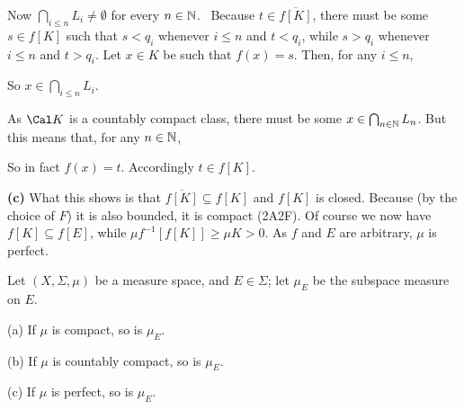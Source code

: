 {\noindent Now $\bigcap_{i\le n}L_i\ne\emptyset$ for every $n\in\Bbb N$.
\Prf\ Because $t\in\overline{f[K]}$, there must be some $s\in f[K]$ such
that $s<q_i$ whenever $i\le n$ and $t<q_i$, while $s>q_i$ whenever $i\le
n$ and $t>q_i$.   Let $x\in K$ be such that $f(x)=s$.   Then, for any
$i\le n$,




\noindent So $x\in\bigcap_{i\le n}L_i$.\ \Qed

As $\Cal K$ is a countably compact class, there must be some
$x\in\bigcap_{n\in\Bbb N}L_n$.   But this means that, for any $n\in\Bbb
N$,



\noindent So in fact $f(x)=t$.   Accordingly $t\in f[K]$.

\medskip

{\bf (c)} What this shows is that $\overline{f[K]}\subseteq f[K]$ and
$f[K]$ is closed.   Because (by the choice of $F$) it is also bounded,
it is compact (2A2F).   Of course we now have $f[K]\subseteq f[E]$,
while $\mu f^{-1}[f[K]]\ge\mu K>0$.   As $f$ and $E$ are arbitrary,
$\mu$ is perfect.
}%

 Let $(X,\Sigma,\mu)$ be a measure space, and
$E\in\Sigma$;  let $\mu_E$ be the subspace measure on $E$.

(a) If $\mu$ is compact, so is $\mu_E$.

(b) If $\mu$ is countably compact, so is $\mu_E$.

(c) If $\mu$ is perfect, so is $\mu_E$.


